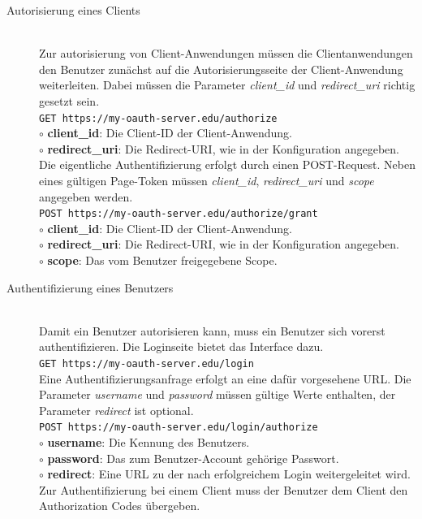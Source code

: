 \documentclass[12pt,a4paper,pointednumbers,abstracton]{scrartcl}
\newcommand{\code}[1]{\small\lstinline[style=InlinePHP]!#1!\normalsize}
\begin{document}
\begin{description}
	\item[Autorisierung eines Clients] \hfill \\
		Zur autorisierung von Client-Anwendungen müssen die Clientanwendungen den Benutzer zunächst auf die Autorisierungsseite der Client-Anwendung weiterleiten.
		Dabei müssen die Parameter \emph{client\_id} und \emph{redirect\_uri} richtig gesetzt sein.\\
		\code{GET https://my-oauth-server.edu/authorize}\\
		$\circ$ \textbf{client\_id}: Die Client-ID der Client-Anwendung.\\
		$\circ$ \textbf{redirect\_uri}: Die Redirect-URI, wie in der Konfiguration angegeben.\\[0.7em]
		Die eigentliche Authentifizierung erfolgt durch einen POST-Request.
		Neben eines gültigen Page-Token müssen \emph{client\_id}, \emph{redirect\_uri} und \emph{scope} angegeben werden.\\
		\code{POST https://my-oauth-server.edu/authorize/grant}\\
		$\circ$ \textbf{client\_id}: Die Client-ID der Client-Anwendung.\\
		$\circ$ \textbf{redirect\_uri}: Die Redirect-URI, wie in der Konfiguration angegeben.\\
		$\circ$ \textbf{scope}: Das vom Benutzer freigegebene Scope.
	\item[Authentifizierung eines Benutzers] \hfill \\
		Damit ein Benutzer autorisieren kann, muss ein Benutzer sich vorerst authentifizieren.
		Die Loginseite bietet das Interface dazu.\\
		\code{GET https://my-oauth-server.edu/login}\\[0.7em]
		Eine Authentifizierungsanfrage erfolgt an eine dafür vorgesehene URL.
		Die Parameter \emph{username} und \emph{password} müssen gültige Werte enthalten, der Parameter \emph{redirect} ist optional.\\
		\code{POST https://my-oauth-server.edu/login/authorize}\\
		$\circ$ \textbf{username}: Die Kennung des Benutzers.\\
		$\circ$ \textbf{password}: Das zum Benutzer-Account gehörige Passwort.\\
		$\circ$ \textbf{redirect}: Eine URL zu der nach erfolgreichem Login weitergeleitet wird.\\[0.7em]
		Zur Authentifizierung bei einem Client muss der Benutzer dem Client den Authorization Codes übergeben.

\end{description}
\end{document}
